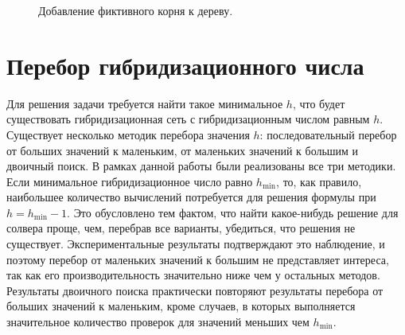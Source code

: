 \begin{figure}[t]
  \hspace{2cm}
  \caption{Добавление фиктивного корня к дереву.}
  \label{dummy-example}
\end{figure}

\FloatBarrier
\section{Перебор гибридизационного числа}

Для решения задачи требуется найти такое минимальное $h$, что будет существовать гибридизационная сеть с гибридизационным числом равным $h$.
Существует несколько методик перебора значения $h$: последовательный перебор от больших значений к маленьким, от маленьких значений к большим и двоичный поиск.
В рамках данной работы были реализованы все три методики.
Если минимальное гибридизационное число равно $h_\mathrm{min}$, то, как правило, наибольшее количество вычислений потребуется для решения формулы при $h = h_\mathrm{min} - 1$.
Это обусловлено тем фактом, что найти какое-нибудь решение для солвера проще, чем, перебрав все варианты, убедиться, что решения не существует.
Экспериментальные результаты подтверждают это наблюдение, и поэтому перебор от маленьких значений к большим не представляет интереса, так как его производительность значительно ниже чем у остальных методов.
Результаты двоичного поиска практически повторяют результаты перебора от больших значений к маленьким, кроме случаев, в которых выполняется значительное количество проверок для значений меньших чем $h_\mathrm{min}$.


